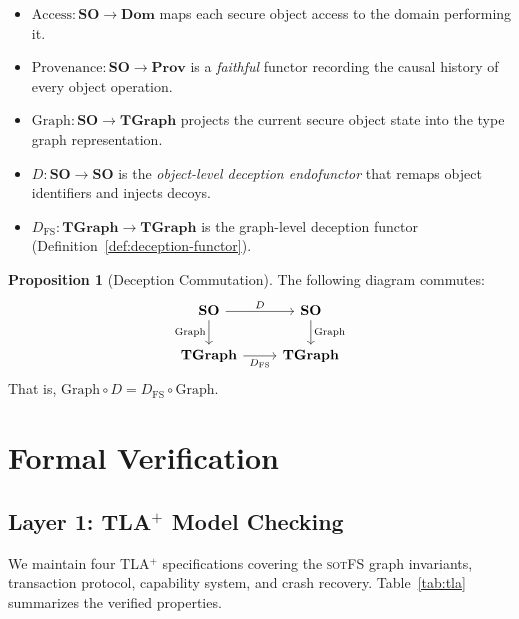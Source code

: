 \documentclass[11pt,a4paper]{article}
\theoremstyle{definition}
\newtheorem{proposition}[theorem]{Proposition}
\theoremstyle{remark}
\newcommand{\sotfs}{\textsc{sotFS}}
\newcommand{\cat}[1]{\ensuremath{\mathbf{#1}}}
\begin{document}
\begin{itemize}[leftmargin=1.4em]
\item $\mathrm{Access} : \cat{SO} \to \cat{Dom}$ maps each secure
  object access to the domain performing it.
\item $\mathrm{Provenance} : \cat{SO} \to \cat{Prov}$ is a
  \emph{faithful} functor recording the causal history of every object
  operation.
\item $\mathrm{Graph} : \cat{SO} \to \cat{TGraph}$ projects the
  current secure object state into the type graph representation.
\item $D : \cat{SO} \to \cat{SO}$ is the \emph{object-level deception
  endofunctor} that remaps object identifiers and injects decoys.
\item $D_{\mathrm{FS}} : \cat{TGraph} \to \cat{TGraph}$ is the
  graph-level deception functor (Definition~\ref{def:deception-functor}).
\end{itemize}

\begin{proposition}[Deception Commutation]
\label{prop:deception-commutes}
The following diagram commutes:
\[
\begin{tikzcd}
\cat{SO} \arrow[r, "D"] \arrow[d, "\mathrm{Graph}"'] &
  \cat{SO} \arrow[d, "\mathrm{Graph}"] \\
\cat{TGraph} \arrow[r, "D_{\mathrm{FS}}"'] & \cat{TGraph}
\end{tikzcd}
\]
That is, $\mathrm{Graph} \circ D = D_{\mathrm{FS}} \circ \mathrm{Graph}$.
\end{proposition}

\section{Formal Verification}
\label{sec:verification}

\subsection{Layer 1: TLA$^+$ Model Checking}
\label{sec:verif-tla}

We maintain four TLA$^+$ specifications covering the \sotfs{} graph
invariants, transaction protocol, capability system, and crash
recovery. Table~\ref{tab:tla} summarizes the verified properties.
\end{document}
